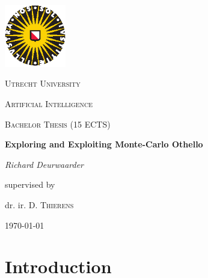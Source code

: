 \documentclass[
11pt, %
english, %
singlespacing, %
headsepline, %
]{MastersDoctoralThesis} %
\author{Richard \textsc{Deurwaarder}} %
\begin{document}

\begin{titlepage}
	\centering
	\includegraphics[width=0.20\textwidth]{images/uu-logo}\par\vspace{1cm}
	{\scshape\LARGE Utrecht University \par}
	\vspace{0.5cm}
	{\scshape\Large Artificial Intelligence\par}
	{\scshape\Large Bachelor Thesis (15 ECTS)\par}
	\vspace{1.5cm}
	{\huge\bfseries Exploring and Exploiting Monte-Carlo Othello\par}
	\vspace{0.5cm}
	{\Large\itshape Richard Deurwaarder\par}
	\vfill
	supervised by\par
	dr. ir. D. \textsc{Thierens}
	
	\vfill
	
	{\large \today\par}
\end{titlepage}

\tableofcontents %



\mainmatter %

\pagestyle{thesis} %

\chapter{Introduction}
\end{document}
